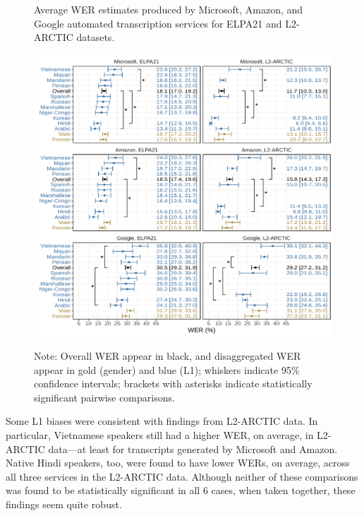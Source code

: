 \documentclass [PhD] {uclathes}
\begin{document}
\begin{figure}[h]
    \centering
    \caption{Average WER estimates produced by Microsoft, Amazon, and Google automated transcription services for ELPA21 and L2-ARCTIC datasets.}
    \includegraphics[width=6.5in]{figures/20230308_wer_plot_cmb_sigBars.pdf}
    \label{fig:wer_l2}
\caption*{\small Note: Overall WER appear in black, and disaggregated WER appear in gold (gender) and blue (L1); whiskers indicate 95\% confidence intervals; brackets with asterisks indicate statistically significant pairwise comparisons.}
\end{figure}

Some L1 biases were consistent with findings from L2-ARCTIC data. In particular, Vietnamese speakers still had a higher WER, on average, in L2-ARCTIC data---at least for transcripts generated by Microsoft and Amazon. Native Hindi speakers, too, were found to have lower WERs, on average, across all three services in the L2-ARCTIC data. Although neither of these comparisons was found to be statistically significant in all 6 cases, when taken together, these findings seem quite robust. 
\end{document}
